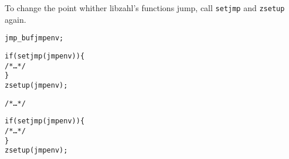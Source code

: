 To change the point whither libzahl's functions
jump, call {\tt setjmp} and {\tt zsetup} again.

\begin{alltt}
   jmp_buf jmpenv;

   if (setjmp(jmpenv)) \{
       \textcolor{c}{/* \textrm{\ldots} */}
   \}
   zsetup(jmpenv);

   \textcolor{c}{/* \textrm{\ldots} */}

   if (setjmp(jmpenv)) \{
       \textcolor{c}{/* \textrm{\ldots} */}
   \}
   zsetup(jmpenv);
\end{alltt}
